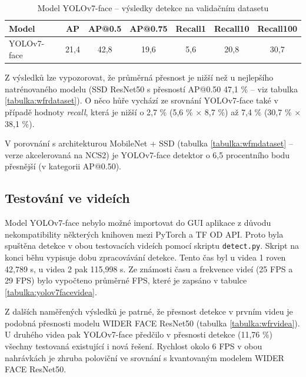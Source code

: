 \begin{table}[H]
  \begin{center}
    \begin{tabular}{|l|c|c|c|c|c|c|}
    \hline
    \rowcolor[HTML]{E0DBDB} 
    \textbf{Model}                      & \textbf{AP} & \textbf{AP@0.5} & \textbf{AP@0.75} & \textbf{Recall1} & \textbf{Recall10} & \textbf{Recall100} \\ \hline
    \cellcolor[HTML]{E0DBDB}YOLOv7-face & 21,4        & 42,8            & 19,6             & 5,6              & 20,8              & 30,7               \\ \hline
    \end{tabular}
    \label{tabulka:yolov7face}
    \caption{Model YOLOv7-face -- výsledky detekce na validačním datasetu}
  \end{center}
\end{table}

Z výsledků lze vypozorovat, že průměrná přesnost je nižší než u nejlepšího natrénovaného modelu (SSD ResNet50 s přesností AP@0.50 47,1 \% -- viz tabulka \ref{tabulka:wfrdataset}). O něco hůře vychází ze srovnání YOLOv7-face také v případě hodnoty \emph{recall}, která je nižší o 2,7 \% (5,6 \% $\times$ 8,7 \%) až 7,4 \% (30,7 \% $\times$ 38,1 \%). 

V porovnání s architekturou MobileNet + SSD (tabulka \ref{tabulka:wfmdataset} -- verze akcelerovaná na NCS2) je YOLOv7-face detektor o 6,5 procentního bodu přesnější (v kategorii AP@0.50).


\subsection*{Testování ve videích}
Model YOLOv7-face nebylo možné importovat do GUI aplikace z důvodu nekompatibility některých knihoven mezi PyTorch a TF OD API. Proto byla spuštěna detekce v obou testovacích videích pomocí skriptu \texttt{detect.py}. Skript na konci běhu vypisuje dobu zpracovávání detekce. Tento čas byl u videa 1 roven 42,789 s, u videa 2 pak 115,998 s. Ze známosti času a frekvence videí (25 FPS a 29 FPS) bylo vypočteno průměrné FPS, které je zapsáno v tabulce \ref{tabulka:yolov7facevidea}. 

Z dalších naměřených výsledků je patrné, že přesnost detekce v prvním videu je podobná přesnosti modelu WIDER FACE ResNet50 (tabulka \ref{tabulka:wfrvidea}). U druhého videa pak YOLOv7-face předčilo v přesnosti detekce (11,76 \%) všechny testovaná existující i nová řešení. Rychlost okolo 6 FPS v obou nahrávkách je zhruba poloviční ve srovnání s kvantovaným modelem WIDER FACE ResNet50.



